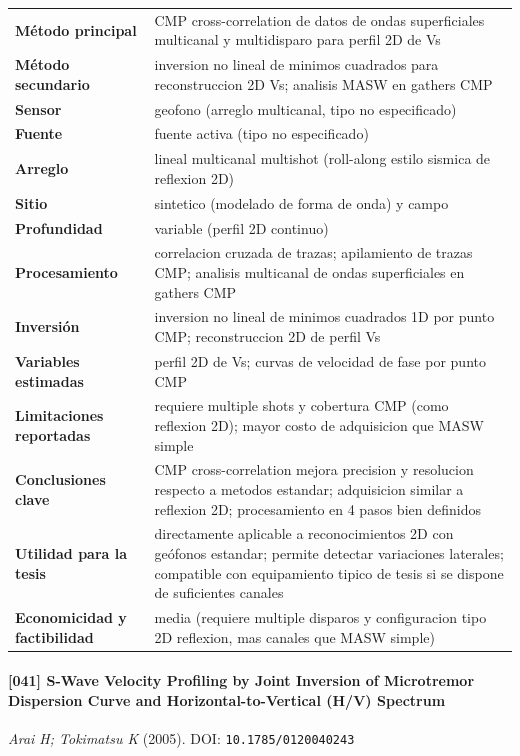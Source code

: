 \begin{center}\scriptsize
\begin{tabularx}{\textwidth}{@{}>{\bfseries}p{3.3cm} X@{}}
\toprule
M\'etodo principal & CMP cross-correlation de datos de ondas superficiales multicanal y multidisparo para perfil 2D de Vs \\
M\'etodo secundario & inversion no lineal de minimos cuadrados para reconstruccion 2D Vs; analisis MASW en gathers CMP \\
Sensor & geofono (arreglo multicanal, tipo no especificado) \\
Fuente & fuente activa (tipo no especificado) \\
Arreglo & lineal multicanal multishot (roll-along estilo sismica de reflexion 2D) \\
Sitio & sintetico (modelado de forma de onda) y campo \\
Profundidad & variable (perfil 2D continuo) \\
Procesamiento & correlacion cruzada de trazas; apilamiento de trazas CMP; analisis multicanal de ondas superficiales en gathers CMP \\
Inversi\'on & inversion no lineal de minimos cuadrados 1D por punto CMP; reconstruccion 2D de perfil Vs \\
Variables estimadas & perfil 2D de Vs; curvas de velocidad de fase por punto CMP \\
Limitaciones reportadas & requiere multiple shots y cobertura CMP (como reflexion 2D); mayor costo de adquisicion que MASW simple \\
Conclusiones clave & CMP cross-correlation mejora precision y resolucion respecto a metodos estandar; adquisicion similar a reflexion 2D; procesamiento en 4 pasos bien definidos \\
Utilidad para la tesis & directamente aplicable a reconocimientos 2D con geófonos estandar; permite detectar variaciones laterales; compatible con equipamiento tipico de tesis si se dispone de suficientes canales \\
Economicidad y factibilidad & media (requiere multiple disparos y configuracion tipo 2D reflexion, mas canales que MASW simple) \\
\bottomrule
\end{tabularx}
\end{center}

\paragraph{[041] S-Wave Velocity Profiling by Joint Inversion of Microtremor Dispersion Curve and Horizontal-to-Vertical (H/V) Spectrum} \emph{Arai H; Tokimatsu K} (2005).
{\scriptsize DOI: \texttt{10.1785/0120040243}}

